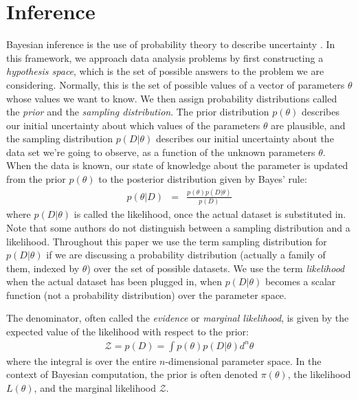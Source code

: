 \documentclass[useAMS,usenatbib]{mn2e}
\begin{document}
\section{Inference}
Bayesian inference is the use of probability theory to describe uncertainty
\citep{sivia, ohagan}. In this framework, we approach data analysis problems by first
constructing a {\it hypothesis space}, which is the set of possible answers
to the problem we are considering. Normally, this is the set of possible
values of a vector of parameters $\theta$ whose values we want
to know. We then assign probability distributions
called the {\it prior} and the {\it sampling distribution}. The prior
distribution $p(\theta)$ describes
our initial uncertainty about which values of the parameters
$\theta$ are plausible, and the
sampling distribution $p(D | \theta)$ describes
our initial uncertainty about the data set we're going to observe, as a
function of the unknown parameters $\theta$.
When the data is known, our state of knowledge about the parameter is
updated from the prior $p(\theta)$ to the posterior distribution given by
Bayes' rule:
\begin{eqnarray}
p(\theta | D) &=&
\frac{p(\theta)p(D | \theta)}
{p(D)}
\end{eqnarray}
where $p(D | \theta)$ is called the likelihood, once the actual dataset
is substituted in. Note that some authors do not distinguish between a
sampling distribution and a likelihood. Throughout this paper we use the term
sampling distribution for $p(D|\theta)$ if we are discussing a probability
distribution (actually a family of them, indexed by $\theta$)
over the set of possible datasets. We use the term {\it likelihood}
when the actual dataset has been plugged in, when $p(D|\theta)$
becomes a scalar function (not a probability distribution)
over the parameter space.

The denominator, often called the {\it evidence} or
{\it marginal likelihood}, is given by the expected value of the likelihood
with respect to the prior:
\begin{eqnarray}
\mathcal{Z} = p(D) = \int p(\theta) p(D | \theta) d^n \theta
\end{eqnarray}
where the integral is over the entire $n$-dimensional parameter space.
In the context of Bayesian computation, the prior is often denoted $\pi(\theta)$,
the likelihood $L(\theta)$, and the marginal likelihood $\mathcal{Z}$.
\end{document}
